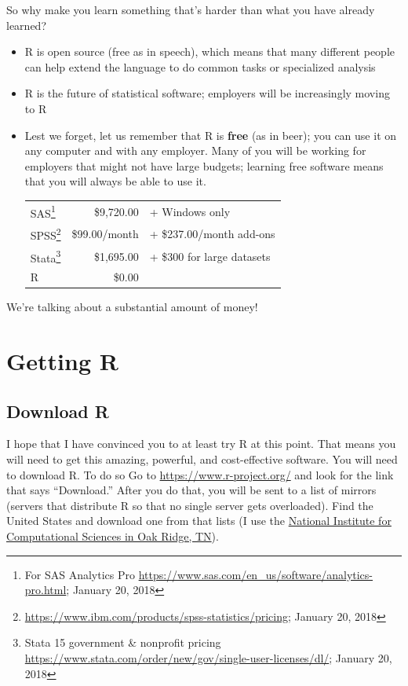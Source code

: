 \documentclass[]{article}
\let\rmarkdownfootnote\footnote%
\def\footnote{\protect\rmarkdownfootnote}
\begin{document}
So why make you learn something that's harder than what you have already
learned?

\begin{itemize}
\item
  R is open source (free as in speech), which means that many different
  people can help extend the language to do common tasks or specialized
  analysis
\item
  R is the future of statistical software; employers will be
  increasingly moving to R
\item
  Lest we forget, let us remember that R is \textbf{free} (as in beer);
  you can use it on any computer and with any employer. Many of you will
  be working for employers that might not have large budgets; learning
  free software means that you will always be able to use it.

  \begin{longtable}[]{@{}lrl@{}}
  \toprule
  SAS\footnote{For SAS Analytics Pro
    \url{https://www.sas.com/en_us/software/analytics-pro.html}; January
    20, 2018} & \$9,720.00 & + Windows only\tabularnewline
  SPSS\footnote{\url{https://www.ibm.com/products/spss-statistics/pricing};
    January 20, 2018} & \$99.00/month & + \$237.00/month
  add-ons\tabularnewline
  Stata\footnote{Stata 15 government \& nonprofit pricing
    \url{https://www.stata.com/order/new/gov/single-user-licenses/dl/};
    January 20, 2018} & \$1,695.00 & + \$300 for large
  datasets\tabularnewline
  R & \$0.00 &\tabularnewline
  \bottomrule
  \end{longtable}
\end{itemize}

We're talking about a substantial amount of money!

\section{Getting R}\label{getting-r}

\subsection{Download R}\label{download-r}

I hope that I have convinced you to at least try R at this point. That
means you will need to get this amazing, powerful, and cost-effective
software. You will need to download R. To do so Go to
\url{https://www.r-project.org/} and look for the link that says
``Download.'' After you do that, you will be sent to a list of mirrors
(servers that distribute R so that no single server gets overloaded).
Find the United States and download one from that lists (I use the
\href{https://mirrors.nics.utk.edu/cran/}{National Institute for
Computational Sciences in Oak Ridge, TN}).
\end{document}
